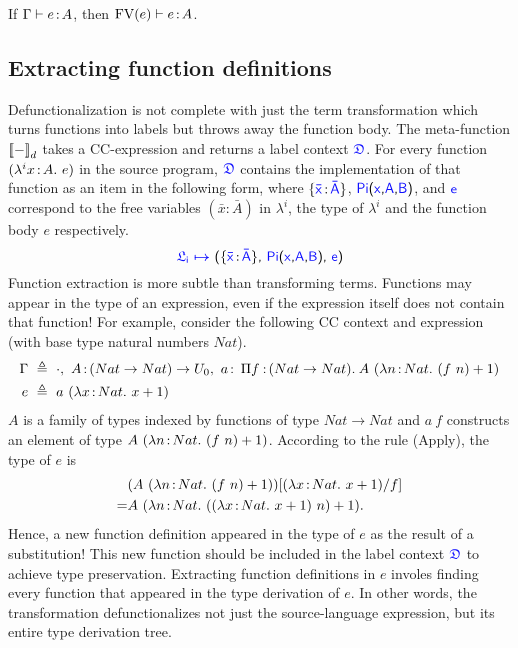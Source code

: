 \begin{lemma}If $\Gamma \vdash e \hspace{0.5mm}{:}\hspace{0.5mm} A$, then $\text{FV}(e) \vdash e \hspace{0.5mm}{:}\hspace{0.5mm} A$.
\label{lem:fv}
\end{lemma}

\subsection{Extracting function definitions}

Defunctionalization is not complete with just the term transformation which turns functions into labels but throws away the function body. The meta-function ${[\![ - ]\!]}_d$ takes a CC-expression and returns a label context $\target{\fdef}$.
For every function $(\lambda^{i}x\hspace{0.5mm}{:}\hspace{0.5mm} A.\ e)$ in the source program, $\target{\fdef}$ contains the implementation of that function as an item in the following form, where $\{\itemtype{\bar{x}}{\bar{A}}\}$, $\targetpi{x}{A}{B}$, and $\target{e}$ correspond to the free variables $(\bar{x} \mathrel{:} \bar{A})$ in $\lambda^i$, the type of $\lambda^i$ and the function body $e$ respectively.
\begin{equation*}
	\itemdef{\target{\flabel_i}}{\itemtype{\bar{x}}{\bar{A}}}{\targetpi{x}{A}{B}}{\target{e}}
\end{equation*}
Function extraction is more subtle than transforming terms. Functions may appear in the type of an expression, even if the expression itself does not contain that function! For example, consider the following CC context and expression (with base type natural numbers $Nat$).
\begin{align*}
	\Gamma\ & \triangleq\ \cdot,\ A \goodcolon (Nat \rightarrow Nat) \rightarrow U_0,\ 
	a \goodcolon\ \pitype{f}{(Nat \rightarrow Nat)}{A\ (\lam{n}{Nat}{(f\ n) + 1})} \\
	e\ & \triangleq\ a\ (\lam{x}{Nat}{x+1})
\end{align*}
$A$ is a family of types indexed by functions of type $Nat \rightarrow Nat$ and $a\ f$ constructs an element of type $A\ (\lam{n}{Nat}{(f\ n) + 1})$. According to the rule ({Apply}), the type of $e$ is 
\begin{align*}
	& (A\ (\lambda n\hspace{0.5mm}{:}\hspace{0.5mm} Nat.\ (f\ n) + 1))[(\lambda x\hspace{0.5mm}{:}\hspace{0.5mm} Nat.\ x+1)\slash f]\\
	= & A\ (\lambda n\hspace{0.5mm}{:}\hspace{0.5mm} Nat.\ ((\lambda x\hspace{0.5mm}{:}\hspace{0.5mm} Nat.\ x+1)\ n) + 1).
\end{align*}
Hence, a new function definition appeared in the type of $e$ as the result of a substitution! This new function should be included in the label context $\target{\fdef}$ to achieve type preservation. Extracting function definitions in $e$ involes finding every function that appeared in the type derivation of $e$. In other words, the transformation defunctionalizes not just the source-language expression, but its entire type derivation tree.

